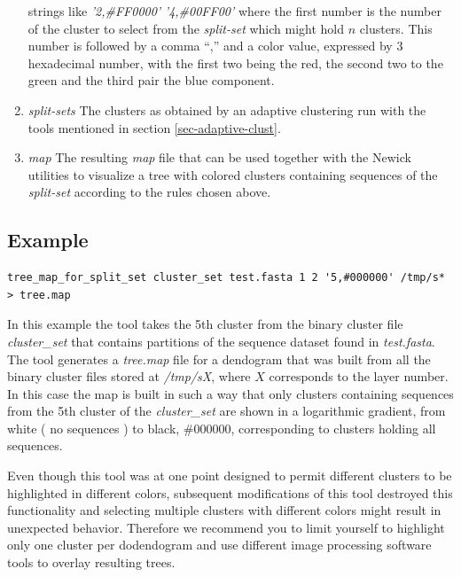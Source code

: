 \begin{enumerate}
    strings like \emph{'2,\#FF0000'} \emph{'4,\#00FF00'} where the
    first number is the number of the cluster to select from the
    \emph{split-set} which might hold $n$ clusters. This number is
    followed by a comma ``,'' and a color value, expressed by 3
    hexadecimal number, with the first two being the red, the
    second two to the green and the third pair the blue component.
  \item \emph{split-sets} The clusters as obtained by an adaptive
    clustering run with the tools mentioned in section
    \ref{sec-adaptive-clust}.
  \item \emph{map} The resulting \emph{map} file that can be used
    together with the Newick utilities to visualize a tree with colored
    clusters containing sequences of the \emph{split-set} according to
    the rules chosen above.
\end{enumerate}

\subsection{Example}
\begin{lstlisting}
tree_map_for_split_set cluster_set test.fasta 1 2 '5,#000000' /tmp/s* > tree.map
\end{lstlisting}
In this example the tool takes the 5th cluster from the binary cluster file
\emph{cluster\_set} that contains partitions of the sequence dataset
found in \emph{test.fasta}. The tool generates a \emph{tree.map} file
for a dendogram that was built from all the binary cluster files
stored at \emph{/tmp/sX}, where $X$ corresponds to the layer
number. In this case the map is built in such a way that only clusters
containing sequences from the 5th cluster of the \emph{cluster\_set}
are shown in a logarithmic gradient, from white ( no sequences ) to
black, \#000000, corresponding to clusters holding all sequences.

Even though this tool was at one point designed to permit different clusters
to be highlighted in different colors, subsequent modifications of this
tool destroyed this functionality and selecting multiple clusters with
different colors might result in unexpected behavior. Therefore we recommend
you to limit yourself to highlight only one cluster per dodendogram and use
different image processing software tools to overlay resulting trees.

